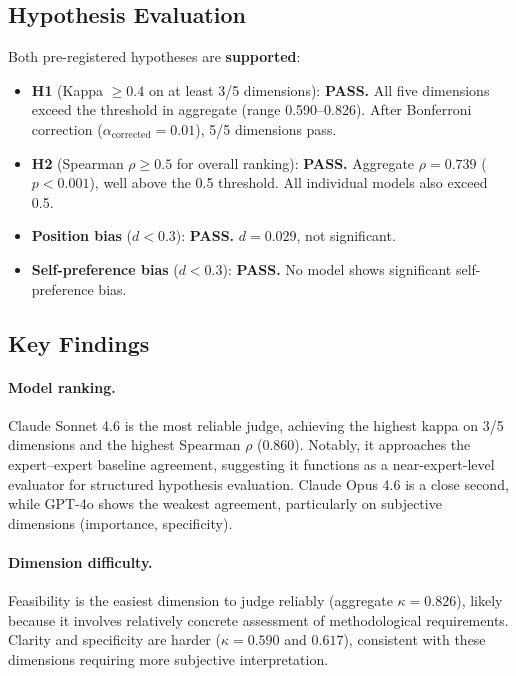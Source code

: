 \documentclass[11pt,a4paper]{article}
\begin{document}
\subsection{Hypothesis Evaluation}

Both pre-registered hypotheses are \textbf{supported}:

\begin{itemize}
  \item \textbf{H1} (Kappa $\geq 0.4$ on at least 3/5 dimensions):
    \textbf{PASS.}  All five dimensions exceed the threshold in aggregate
    (range 0.590--0.826).  After Bonferroni correction
    ($\alpha_{\text{corrected}} = 0.01$), 5/5 dimensions pass.
  \item \textbf{H2} (Spearman $\rho \geq 0.5$ for overall ranking):
    \textbf{PASS.}  Aggregate $\rho = 0.739$ ($p < 0.001$), well above
    the 0.5 threshold.  All individual models also exceed 0.5.
  \item \textbf{Position bias} ($d < 0.3$): \textbf{PASS.}
    $d = 0.029$, not significant.
  \item \textbf{Self-preference bias} ($d < 0.3$): \textbf{PASS.}
    No model shows significant self-preference bias.
\end{itemize}

\subsection{Key Findings}

\paragraph{Model ranking.}  Claude Sonnet 4.6 is the most reliable judge,
achieving the highest kappa on 3/5 dimensions and the highest Spearman
$\rho$ (0.860).  Notably, it approaches the expert--expert baseline
agreement, suggesting it functions as a near-expert-level evaluator for
structured hypothesis evaluation.  Claude Opus 4.6 is a close second,
while GPT-4o shows the weakest agreement, particularly on subjective
dimensions (importance, specificity).

\paragraph{Dimension difficulty.}  Feasibility is the easiest dimension to
judge reliably (aggregate $\kappa = 0.826$), likely because it involves
relatively concrete assessment of methodological requirements.  Clarity
and specificity are harder ($\kappa = 0.590$ and $0.617$), consistent with
these dimensions requiring more subjective interpretation.
\end{document}
